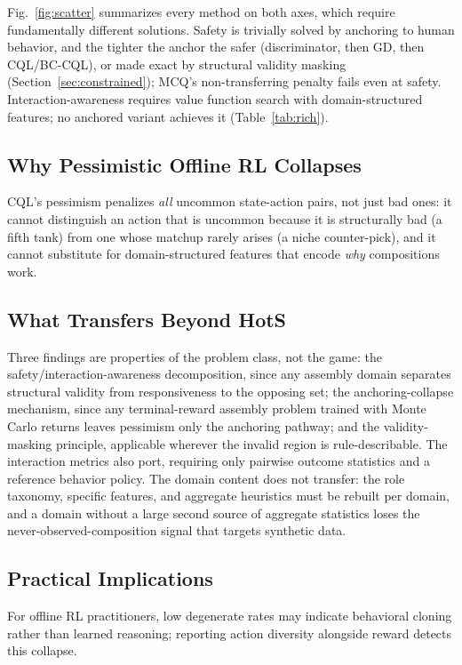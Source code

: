 \documentclass[journal]{IEEEtran}
\begin{document}
Fig.~\ref{fig:scatter} summarizes every method on both axes, which require fundamentally different solutions. Safety is trivially solved by anchoring to human behavior, and the tighter the anchor the safer (discriminator, then GD, then CQL/BC-CQL), or made exact by structural validity masking (Section~\ref{sec:constrained}); MCQ's non-transferring penalty fails even at safety. Interaction-awareness requires value function search with domain-structured features; no anchored variant achieves it (Table~\ref{tab:rich}).

\subsection{Why Pessimistic Offline RL Collapses}

CQL's pessimism penalizes \textit{all} uncommon state-action pairs, not just bad ones: it cannot distinguish an action that is uncommon because it is structurally bad (a fifth tank) from one whose matchup rarely arises (a niche counter-pick), and it cannot substitute for domain-structured features that encode \textit{why} compositions work.

\subsection{What Transfers Beyond HotS}

Three findings are properties of the problem class, not the game: the safety/interaction-awareness decomposition, since any assembly domain separates structural validity from responsiveness to the opposing set; the anchoring-collapse mechanism, since any terminal-reward assembly problem trained with Monte Carlo returns leaves pessimism only the anchoring pathway; and the validity-masking principle, applicable wherever the invalid region is rule-describable. The interaction metrics also port, requiring only pairwise outcome statistics and a reference behavior policy. The domain content does not transfer: the role taxonomy, specific features, and aggregate heuristics must be rebuilt per domain, and a domain without a large second source of aggregate statistics loses the never-observed-composition signal that targets synthetic data.

\subsection{Practical Implications}

For offline RL practitioners, low degenerate rates may indicate behavioral cloning rather than learned reasoning; reporting action diversity alongside reward detects this collapse.
\end{document}
